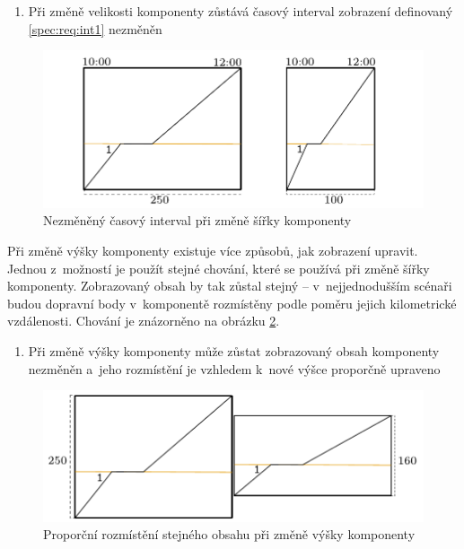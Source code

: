\begin{enumerate}[label=\color{reqcolor}\textbf{R{\arabic*}},resume]
	\item \label{spec:req:width_mod1} Při změně velikosti komponenty zůstává časový interval zobrazení definovaný \ref{spec:req:int1} nezměněn
\end{enumerate}

\begin{figure}[!htb]
	\centering
	\includegraphics[width=\textwidth]{../img/kap2_horizontal_resize}
	\caption{Nezměněný časový interval při změně šířky komponenty}
	\label{fig:spec:zmena_velikosti_horizontalni}
\end{figure}

Při změně výšky komponenty existuje více způsobů, jak zobrazení upravit. Jednou z~možností je použít stejné chování, které se používá při změně šířky komponenty. Zobrazovaný obsah by tak zůstal stejný -- v~nejjednodušším scénaři budou dopravní body v~komponentě rozmístěny podle poměru jejich kilometrické vzdálenosti. Chování je znázorněno na obrázku \ref{fig:spec:zmena_velikosti_vertikalni_modifikace_1}.

\begin{enumerate}[label=\color{reqcolor}\textbf{R{\arabic*}},resume]
	\item \label{spec:req:height_mod1}	Při změně výšky komponenty může zůstat zobrazovaný obsah komponenty nezměněn a~jeho rozmístění je vzhledem k~nové výšce proporčně upraveno
\end{enumerate}

\begin{figure}[!htb]
	\centering
	\includegraphics[width=\textwidth]{../img/kap2_vertical_resize_proportional}
	\caption{Proporční rozmístění stejného obsahu při změně výšky komponenty}
	\label{fig:spec:zmena_velikosti_vertikalni_modifikace_1}
\end{figure}

